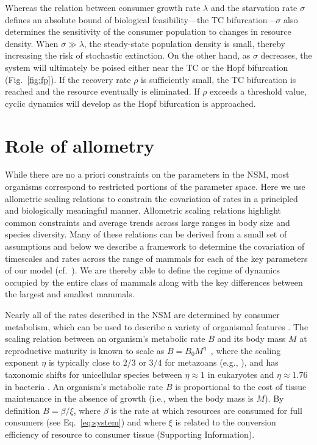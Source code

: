 \documentclass[twocolumn,preprintnumbers,amsmath,amssymb,superscriptaddress]{revtex4}
\begin{document}
Whereas the relation between consumer growth rate $\lambda$ and the
starvation rate $\sigma$ defines an absolute bound of biological
feasibility---the TC bifurcation---$\sigma$ also determines the sensitivity
of the consumer population to changes in resource density.  When
$\sigma\gg\lambda$, the steady-state population density is small, thereby
increasing the risk of stochastic extinction.  On the other hand, as $\sigma$
decreases, the system will ultimately be poised either near the TC or the
Hopf bifurcation (Fig.~\ref{fig:fp}).  If the recovery rate $\rho$ is
sufficiently small, the TC bifurcation is reached and the resource eventually
is eliminated.  If $\rho$ exceeds a threshold value, cyclic dynamics will
develop as the Hopf bifurcation is approached.



\section*{Role of allometry}
While there are no a priori constraints on the parameters in the NSM, most
organisms correspond to restricted portions of the parameter space.  Here we
use allometric scaling relations to constrain the covariation of rates in a
principled and biologically meaningful manner.  Allometric scaling relations
highlight common constraints and average trends across large ranges in body
size and species diversity. Many of these relations can be derived from a
small set of assumptions and below we describe a framework to determine the
covariation of timescales and rates across the range of mammals for each of
the key parameters of our model (cf.~\cite{Yodzis:1992hg}).  We are thereby
able to define the regime of dynamics occupied by the entire class of mammals
along with the key differences between the largest and smallest mammals.


Nearly all of the rates described in the NSM are determined by consumer
metabolism, which can be used to describe a variety of organismal features
\cite{Brown:2004wq}.  The scaling relation between an organism's metabolic
rate $B$ and its body mass $M$ at reproductive maturity is known to scale as
$B = B_0 M^\eta$~\cite{West:2002it}, where the scaling exponent $\eta$ is
typically close to $2/3$ or $3/4$ for metazoans (e.g., \cite{Brown:2004wq}),
and has taxonomic shifts for unicellular species between $\eta\approx 1$ in
eukaryotes and $\eta\approx 1.76$ in bacteria
\cite{DeLong:2010dy,Kempes:2012hy}.
An organism's metabolic rate $B$ is proportional to the cost of tissue
maintenance in the absence of growth (i.e., when the body mass is $M$).  By
definition $B=\beta/\xi$, where $\beta$ is the rate at which resources are
consumed for full consumers (see Eq.~\eqref{eq:system}) and where $\xi$ is
related to the conversion efficiency of resource to consumer tissue
(Supporting Information).
\end{document}
